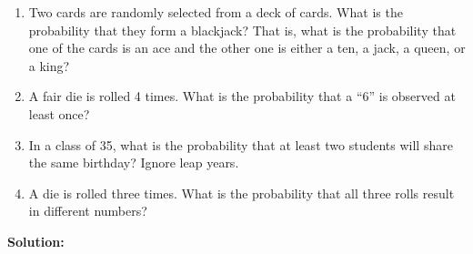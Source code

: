 \documentclass[
  12pt,
]{krantzNoCorner}
\providecommand{\tightlist}{%
  \setlength{\itemsep}{0pt}\setlength{\parskip}{0pt}}
\begin{document}
\begin{enumerate}
\def\labelenumi{\arabic{enumi}.}
\tightlist
\item
  Two cards are randomly selected from a deck of cards. What is the
  probability that they form a blackjack? That is, what is the
  probability that one of the cards is an ace and the other one is
  either a ten, a jack, a queen, or a king?
\item
  A fair die is rolled 4 times. What is the probability that a ``6'' is
  observed at least once?
\item
  In a class of 35, what is the probability that at least two students
  will share the same birthday? Ignore leap years.
\item
  A die is rolled three times. What is the probability that all three
  rolls result in different numbers?
\end{enumerate}

\textbf{Solution:}
\end{document}
